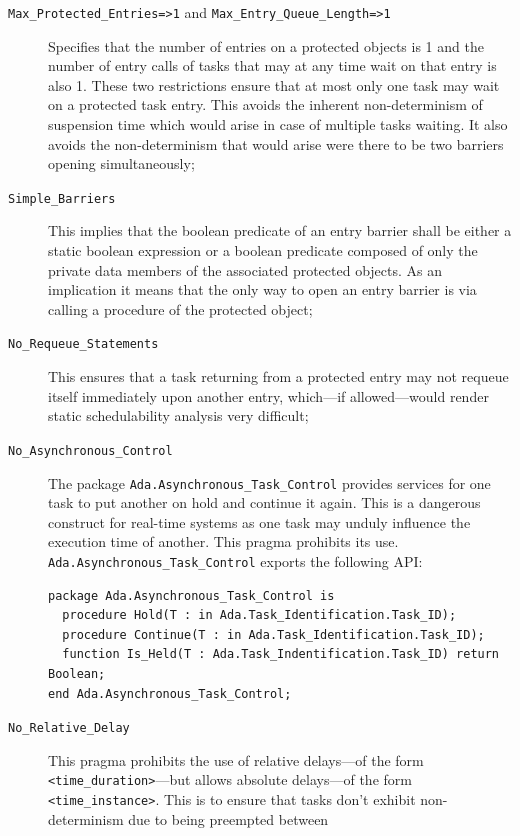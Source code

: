 \begin{description}
\item[\texttt{Max\_Protected\_Entries=>1} and
  \texttt{Max\_Entry\_Queue\_Length=>1}]{Specifies that the number of
  entries on a protected objects is 1 and the number of entry calls of
  tasks that may at any time wait on that entry is also 1. These two
  restrictions ensure that at most only one task may wait on a
  protected task entry. This avoids the inherent non-determinism of
  suspension time which would arise in case of multiple tasks
  waiting. It also avoids the non-determinism that would arise were
  there to be two barriers opening simultaneously;}
\item[\texttt{Simple\_Barriers}]{This implies that the boolean
  predicate of an entry barrier shall be either a static boolean
  expression or a boolean predicate composed of only the private data
  members of the associated protected objects. As an implication it
  means that the only way to open an entry barrier is via calling a
  procedure of the protected object;}
\item[\texttt{No\_Requeue\_Statements}]{This ensures that a task
  returning from a protected entry may not requeue itself immediately
  upon another entry, which---if allowed---would render static
  schedulability analysis very difficult;}
\item[\texttt{No\_Asynchronous\_Control}]{The package
  \texttt{Ada.Asynchronous\_Task\_Control} provides services for one
  task to put another on hold and continue it again. This is a
  dangerous construct for real-time systems as one task may unduly
  influence the execution time of another. This pragma prohibits its
  use. \texttt{Ada.Asynchronous\_Task\_Control} exports the following
  API:
\begin{lstlisting}[label=ada.asynchronous_task_control, caption=The
    \texttt{Ada.Asynchronous\_Task\_Control} package specification]
package Ada.Asynchronous_Task_Control is
  procedure Hold(T : in Ada.Task_Identification.Task_ID);
  procedure Continue(T : in Ada.Task_Identification.Task_ID);
  function Is_Held(T : Ada.Task_Indentification.Task_ID) return Boolean;
end Ada.Asynchronous_Task_Control;
\end{lstlisting}}
\item[\texttt{No\_Relative\_Delay}]{This pragma prohibits the use of
  relative delays---of the form 
  \texttt{<time\_duration>}---but allows absolute delays---of the form
   \texttt{<time\_instance>}. This is to ensure that
  tasks don't exhibit non-determinism due to being preempted between
}
\end{description}
